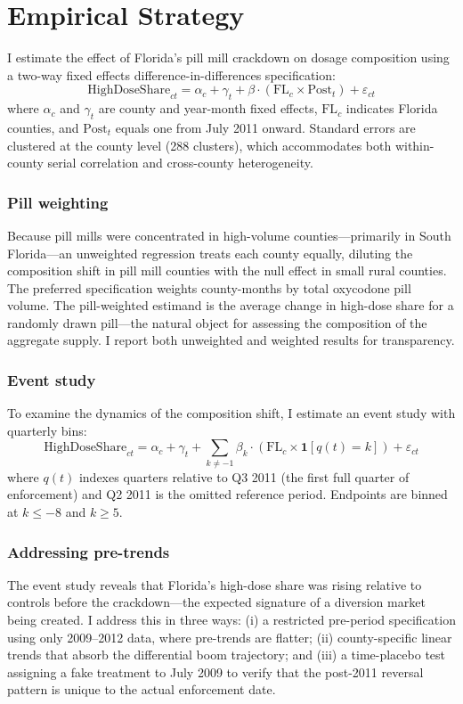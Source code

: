 \documentclass[12pt]{article}
\begin{document}
\section{Empirical Strategy}

I estimate the effect of Florida's pill mill crackdown on dosage composition using a two-way fixed effects difference-in-differences specification:
\begin{equation}
\text{HighDoseShare}_{ct} = \alpha_c + \gamma_t + \beta \cdot (\text{FL}_c \times \text{Post}_t) + \varepsilon_{ct}
\label{eq:did}
\end{equation}
where $\alpha_c$ and $\gamma_t$ are county and year-month fixed effects, $\text{FL}_c$ indicates Florida counties, and $\text{Post}_t$ equals one from July 2011 onward. Standard errors are clustered at the county level (288 clusters), which accommodates both within-county serial correlation and cross-county heterogeneity.

\subsubsection*{Pill weighting} Because pill mills were concentrated in high-volume counties---primarily in South Florida---an unweighted regression treats each county equally, diluting the composition shift in pill mill counties with the null effect in small rural counties. The preferred specification weights county-months by total oxycodone pill volume. The pill-weighted estimand is the average change in high-dose share for a randomly drawn pill---the natural object for assessing the composition of the aggregate supply. I report both unweighted and weighted results for transparency.

\subsubsection*{Event study} To examine the dynamics of the composition shift, I estimate an event study with quarterly bins:
\begin{equation}
\text{HighDoseShare}_{ct} = \alpha_c + \gamma_t + \sum_{k \neq -1} \beta_k \cdot (\text{FL}_c \times \mathbf{1}[q(t) = k]) + \varepsilon_{ct}
\label{eq:eventstudy}
\end{equation}
where $q(t)$ indexes quarters relative to Q3 2011 (the first full quarter of enforcement) and Q2 2011 is the omitted reference period. Endpoints are binned at $k \leq -8$ and $k \geq 5$.

\subsubsection*{Addressing pre-trends} The event study reveals that Florida's high-dose share was rising relative to controls before the crackdown---the expected signature of a diversion market being created. I address this in three ways: (i) a restricted pre-period specification using only 2009--2012 data, where pre-trends are flatter; (ii) county-specific linear trends that absorb the differential boom trajectory; and (iii) a time-placebo test assigning a fake treatment to July 2009 to verify that the post-2011 reversal pattern is unique to the actual enforcement date.
\end{document}
